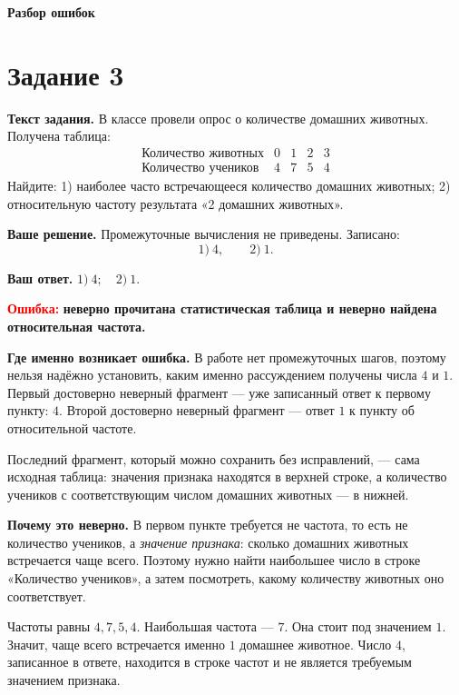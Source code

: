 \documentclass[12pt,a4paper]{article}
\newcommand{\errlabel}[1]{\textcolor{red}{\textbf{Ошибка:}} \textbf{#1}}
\begin{document}
\newpage
\null\vfill
\begin{center}
  {\Huge\bfseries Разбор ошибок}
\end{center}
\vfill\null
\newpage

\label{task:3}
\section*{Задание 3}

\textbf{Текст задания.}
В классе провели опрос о количестве домашних животных. Получена таблица:
\[
\begin{array}{c|cccc}
\text{Количество животных} & 0 & 1 & 2 & 3 \\
\hline
\text{Количество учеников} & 4 & 7 & 5 & 4
\end{array}
\]
Найдите: 1) наиболее часто встречающееся количество домашних животных; 2) относительную частоту результата «2 домашних животных».

\textbf{Ваше решение.}
Промежуточные вычисления не приведены. Записано:
\[
1)\ 4, \qquad 2)\ 1.
\]

\textbf{Ваш ответ.}
$1)\ 4;\quad 2)\ 1.$

\errlabel{неверно прочитана статистическая таблица и неверно найдена относительная частота.}

\textbf{Где именно возникает ошибка.}
В работе нет промежуточных шагов, поэтому нельзя надёжно установить, каким именно рассуждением получены числа $4$ и $1$. Первый достоверно неверный фрагмент --- уже записанный ответ к первому пункту: $4$. Второй достоверно неверный фрагмент --- ответ $1$ к пункту об относительной частоте.

Последний фрагмент, который можно сохранить без исправлений, --- сама исходная таблица: значения признака находятся в верхней строке, а количество учеников с соответствующим числом домашних животных --- в нижней.

\textbf{Почему это неверно.}
В первом пункте требуется не частота, то есть не количество учеников, а \emph{значение признака}: сколько домашних животных встречается чаще всего. Поэтому нужно найти наибольшее число в строке «Количество учеников», а затем посмотреть, какому количеству животных оно соответствует.

Частоты равны $4,7,5,4$. Наибольшая частота --- $7$. Она стоит под значением $1$. Значит, чаще всего встречается именно $1$ домашнее животное. Число $4$, записанное в ответе, находится в строке частот и не является требуемым значением признака.
\end{document}
